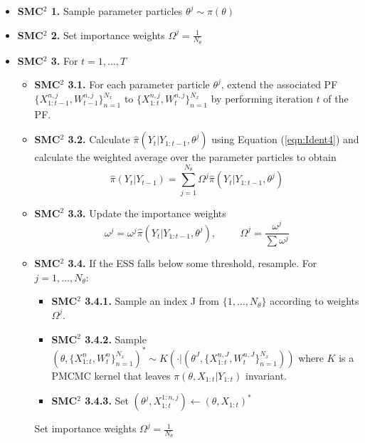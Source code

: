 \documentclass[a4paper,12pt]{article}
\begin{document}
\begin{itemize}
\item {\bf SMC$^2$ 1.} Sample parameter particles $\theta^j \sim \pi(\theta)$

\item {\bf SMC$^2$ 2.} Set importance weights $ \Omega^j = \frac{1}{N_\theta}$

\item {\bf SMC$^2$ 3.} For $t=1,...,T$

\begin{itemize}

\item {\bf SMC$^2$ 3.1.} For each parameter particle $\theta^j$, extend the associated PF  $\{X_{1:t-1}^{n,j}, W_{t-1}^{n,j}\}_{n=1}^{N_x}$ to  $\{X_{1:t}^{n,j}, W_t^{n,j}\}_{n=1}^{N_x}$ by performing iteration $t$ of the PF.

\item {\bf SMC$^2$ 3.2.} Calculate $\hat{\pi} (Y_t \vert Y_{1:t-1}, \theta^j)$ using Equation (\ref{eqn:Ident4}) and calculate the weighted average over the parameter particles to obtain $$\hat{\pi}(Y_t \vert Y_{t-1}) = \sum_{j=1}^{N_\theta} \Omega^j \hat{\pi} (Y_t \vert Y_{1:t-1}, \theta^j)$$

\item {\bf SMC$^2$ 3.3.} Update the importance weights
\[ \omega^j = \omega^j \hat{\pi} (Y_t \vert Y_{1:t-1}, \theta^j), \hspace{1cm} \Omega^j = \frac{\omega^j}{\sum \omega^j} \]

\item {\bf SMC$^2$ 3.4.} If the ESS falls below some threshold,  resample. For $j=1, \ldots, N_\theta$:

\begin{itemize}

\item {\bf SMC$^2$ 3.4.1.} Sample an index
 J from $\{1, \ldots, N_\theta\}$ %
according to weights $\Omega^j$.

\item {\bf SMC$^2$ 3.4.2.} Sample $\left( \theta, \{X_{1:t}^n, W_t^n\}_{n=1}^{N_x} \right)^{*} \sim K \left(\cdot \vert \left( \theta^J, \{X_{1:t}^{n,J} ,W_t^{n,J}\}_{n=1}^{N_x} \right)\right)$ where $K$ is a PMCMC kernel that leaves $\pi (\theta, X_{1:t} \vert Y_{1:t})$ invariant.

\item {\bf SMC$^2$ 3.4.3.} Set $\left( \theta^j, X_{1:t}^{1:n,j} \right) \leftarrow \left( \theta, X_{1:t} \right)^{*}$



\end{itemize}
Set importance weights
$\Omega^j = \frac{1}{N_\theta}$
\end{itemize}

\end{itemize}
\end{document}
